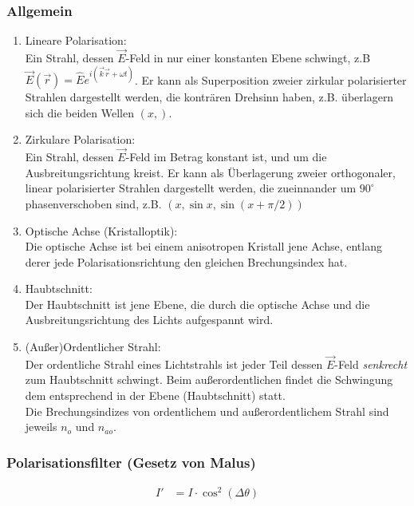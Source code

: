 \documentclass[twocolumn, unnumberedsubsub]{summery}
\begin{document}
\subsubsection{Allgemein}
\begin{enumerate}
    \item Lineare Polarisation:\\
    Ein Strahl, dessen \(\vec E\)-Feld in nur einer konstanten Ebene schwingt, z.B 
    $\vec E(\vec r) = \hat E e^{i(\vec k \vec r + \omega t)}$. Er kann als Superposition zweier zirkular polarisierter Strahlen dargestellt werden, 
    die konträren Drehsinn haben, z.B. überlagern sich die beiden Wellen $(x, )$.
    \item Zirkulare Polarisation:\\
    Ein Strahl, dessen \(\vec E\)-Feld im Betrag konstant ist, und um die Ausbreitungsrichtung
    kreist. Er kann als Überlagerung zweier orthogonaler, linear polarisierter
    Strahlen dargestellt werden, die zueinnander um \(90^\circ\) phasenverschoben sind,
    z.B. \((x, \sin x, \sin(x+\pi/2))\)
    \item Optische Achse (Kristalloptik):\\
    Die optische Achse ist bei einem anisotropen Kristall jene Achse, entlang derer 
    jede Polarisationsrichtung den gleichen Brechungsindex hat.
    \item Haubtschnitt:\\
    Der Haubtschnitt ist jene Ebene, die durch die optische Achse und die Ausbreitungsrichtung 
    des Lichts aufgespannt wird.
    \item (Au{\ss}er)Ordentlicher Strahl:\\
    Der ordentliche Strahl eines Lichtstrahls ist jeder Teil dessen \(\vec E\)-Feld \emph{senkrecht}
    zum Haubtschnitt schwingt. Beim au{\ss}erordentlichen findet die Schwingung dem entsprechend 
    in der Ebene (Haubtschnitt) statt.\\
    Die Brechungsindizes von ordentlichem und au{\ss}erordentlichem Strahl sind 
    jeweils \(n_o\) und \(n_{ao}\).
\end{enumerate}

\subsubsection{Polarisationsfilter (Gesetz von Malus)}
\begin{align*}
    I' &= I \cdot \cos^2(\Delta \theta)
\end{align*}
\end{document}
